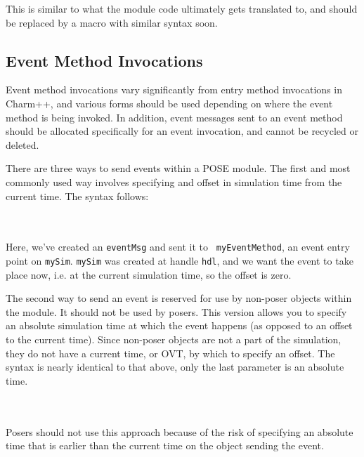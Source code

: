 \documentclass[10pt]{article}
\begin{document}
This is similar to what the module code ultimately gets translated to,
and should be replaced by a macro with similar syntax soon.

\subsection{Event Method Invocations}

Event method invocations vary significantly from entry method
invocations in Charm++, and various forms should be used depending on
where the event method is being invoked.  In addition, event messages
sent to an event method should be allocated specifically for an event
invocation, and cannot be recycled or deleted.

There are three ways to send events within a POSE module.  The first
and most commonly used way involves specifying and offset in
simulation time from the current time.  The syntax follows:

~\\
\\

Here, we've created an {\tt eventMsg} and sent it to {\tt
myEventMethod}, an event entry point on {\tt mySim}.  {\tt mySim} was
created at handle {\tt hdl}, and we want the event to take place now,
i.e. at the current simulation time, so the offset is zero.  

The second way to send an event is reserved for use by non-poser
objects within the module.  It should not be used by posers.  This
version allows you to specify an absolute simulation time at which the
event happens (as opposed to an offset to the current time).  Since
non-poser objects are not a part of the simulation, they do not have a
current time, or OVT, by which to specify an offset.  The syntax is
nearly identical to that above, only the last parameter is an absolute
time.

~\\
\\

Posers should not use this approach because of the risk of specifying
an absolute time that is earlier than the current time on the object
sending the event.  
\end{document}
